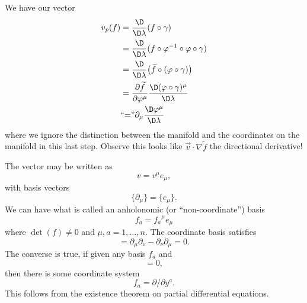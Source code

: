 \noindent\ignorespaces %
We have our vector
\begin{subequations}
\begin{align}
v_{p}(f)
&=\frac{\D}{\D\lambda}(f\circ\gamma)\\
&=\frac{\D}{\D\lambda}(f\circ\varphi^{-1}\circ\varphi\circ\gamma)\\
&=\frac{\D}{\D\lambda}\bigl(\widetilde{f}\circ(\varphi\circ\gamma)\bigr)\\
&=\frac{\partial\widetilde{f}}{\partial\varphi^{\mu}}
\frac{\D(\varphi\circ\gamma)^{\mu}}{\D\lambda}\\
&\mbox{``=''}\partial_{\mu}\frac{\D\varphi^{\mu}}{\D\lambda}
\end{align}
\end{subequations}
where we ignore the distinction between the manifold and the
coordinates on the manifold in this last step. Observe this looks
like $\vec{v}\cdot\nabla\widetilde{f}$ the directional derivative!

The vector may be written as
\begin{equation}
v=v^{\mu}e_{\mu},
\end{equation}
with basis vectors
\begin{equation}
\{\partial_{\mu}\}=\{e_{\mu}\}.
\end{equation}
We can have what is called an anholonomic (or ``non-coordinate'')
basis 
\begin{equation}
f_{a}={f_{a}}^{\mu}e_{\mu}
\end{equation}
where $\det(f)\not=0$ and $\mu,a=1,\dots,n$. The coordinate basis
satisfies 
\begin{equation}
[e_{\mu},e_{\nu}]=\partial_{\mu}\partial_{\nu}
-\partial_{\nu}\partial_{\mu}=0.
\end{equation}
The converse is true, if given any basis $f_{a}$ and
\begin{equation}
[f_{a},f_{b}]=0,
\end{equation}
then there is some coordinate system 
\begin{equation}
f_{a}=\partial/\partial y^{a}.
\end{equation}
This follows from the existence theorem on partial differential equations.

